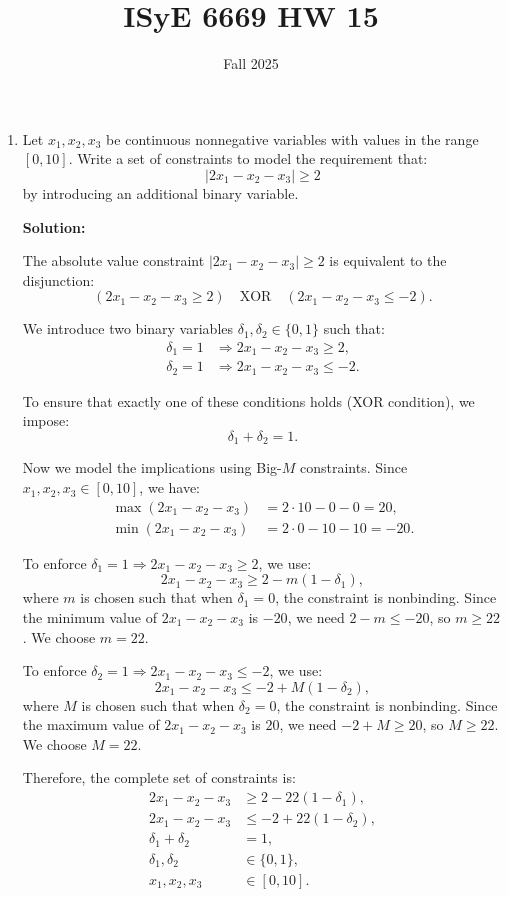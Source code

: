 \documentclass{article}
\title{ISyE 6669 HW 15}
\date{Fall 2025}
\begin{document}
\maketitle

\begin{enumerate}
    \item Let \( x_1, x_2, x_3 \) be continuous nonnegative variables with values in the range \([0, 10]\). Write a set of constraints to model the requirement
that:
\[
|2x_1 - x_2 - x_3| \geq 2
\]
by introducing an additional binary variable. 

\textbf{Solution:}

The absolute value constraint $|2x_1 - x_2 - x_3| \geq 2$ is equivalent to the disjunction:
\[
(2x_1 - x_2 - x_3 \geq 2) \quad \text{XOR} \quad (2x_1 - x_2 - x_3 \leq -2).
\]

We introduce two binary variables $\delta_1, \delta_2 \in \{0,1\}$ such that:
\begin{align*}
\delta_1 = 1 &\Rightarrow 2x_1 - x_2 - x_3 \geq 2, \\
\delta_2 = 1 &\Rightarrow 2x_1 - x_2 - x_3 \leq -2.
\end{align*}

To ensure that exactly one of these conditions holds (XOR condition), we impose:
\[
\delta_1 + \delta_2 = 1.
\]

Now we model the implications using Big-$M$ constraints. Since $x_1, x_2, x_3 \in [0, 10]$, we have:
\begin{align*}
\max(2x_1 - x_2 - x_3) &= 2 \cdot 10 - 0 - 0 = 20, \\
\min(2x_1 - x_2 - x_3) &= 2 \cdot 0 - 10 - 10 = -20.
\end{align*}

To enforce $\delta_1 = 1 \Rightarrow 2x_1 - x_2 - x_3 \geq 2$, we use:
\[
2x_1 - x_2 - x_3 \geq 2 - m(1 - \delta_1),
\]
where $m$ is chosen such that when $\delta_1 = 0$, the constraint is nonbinding. Since the minimum value of $2x_1 - x_2 - x_3$ is $-20$, we need $2 - m \leq -20$, so $m \geq 22$. We choose $m = 22$.

To enforce $\delta_2 = 1 \Rightarrow 2x_1 - x_2 - x_3 \leq -2$, we use:
\[
2x_1 - x_2 - x_3 \leq -2 + M(1 - \delta_2),
\]
where $M$ is chosen such that when $\delta_2 = 0$, the constraint is nonbinding. Since the maximum value of $2x_1 - x_2 - x_3$ is $20$, we need $-2 + M \geq 20$, so $M \geq 22$. We choose $M = 22$.

Therefore, the complete set of constraints is:
\begin{align*}
2x_1 - x_2 - x_3 &\geq 2 - 22(1 - \delta_1), \\
2x_1 - x_2 - x_3 &\leq -2 + 22(1 - \delta_2), \\
\delta_1 + \delta_2 &= 1, \\
\delta_1, \delta_2 &\in \{0,1\}, \\
x_1, x_2, x_3 &\in [0, 10].
\end{align*}


\end{enumerate}
\end{document}
